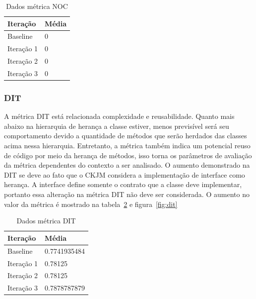 \documentclass[conference]{IEEEtran}
\begin{document}
\begin{table}[!h]
	\centering
	    \caption{\label{tab:noc} Dados métrica NOC}
    \begin{tabular}{ | l | l | }
    \hline
    Iteração & Média 			\\ \hline
    Baseline & 0  	\\ \hline
    Iteração 1 & 0			\\ \hline
	Iteração 2 & 0				\\ \hline
	Iteração 3 & 0	\\ \hline
    \end{tabular}
    
\end{table}



\subsubsection{DIT}

A métrica DIT está relacionada complexidade e reusabilidade. Quanto mais
abaixo na hierarquia de herança a classe estiver, menos previsível será seu
comportamento devido a quantidade de métodos que serão herdados das classes
acima nessa hierarquia. Entretanto, a métrica também indica um potencial reuso
de código por meio da herança de métodos, isso torna os parâmetros de avaliação
da métrica dependentes do contexto a ser analisado. O aumento demonstrado na DIT
se deve ao fato que o CKJM considera a implementação de interface como herança.
A interface define somente o contrato que a classe deve implementar, portanto
essa alteração na métrica DIT não deve ser considerada. O aumento no valor da
métrica é mostrado na tabela~\ref{tab:dit} e figura~\ref{fig:dit}

\begin{table}[!h]
	\centering
	    \caption{\label{tab:dit} Dados métrica DIT}
    \begin{tabular}{ | l | l | }
    \hline
    Iteração & Média 			\\ \hline
    Baseline & 0.7741935484  	\\ \hline
    Iteração 1 & 0.78125		\\ \hline
	Iteração 2 & 0.78125			\\ \hline
	Iteração 3 & 0.7878787879	\\ \hline
    \end{tabular}
    
\end{table}
\end{document}
